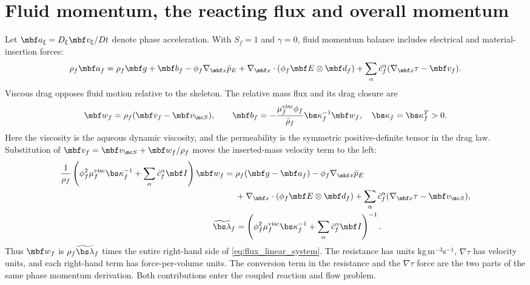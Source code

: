 \documentclass[11pt]{article}
\begin{document}
\section{Fluid momentum, the reacting flux and overall momentum}
Let \(\mbf a_\xi=D_\xi\mbf v_\xi/Dt\) denote phase acceleration. With \(S_f=1\) and \(\gamma=0\), fluid momentum balance includes electrical and material-insertion forces:
\begin{equation}
 \rho_f\mbf a_f=\rho_f\mbf g+\mbf b_f
 -\phi_f\nabla_{\mbf x}\bar p_E
 +\nabla_{\mbf x}\cdot(\phi_f\mbf E\otimes\mbf d_f)
 +\sum_\alpha\dot c_f^\alpha(\nabla_{\mbf x}\tau-\mbf v_f).
 \label{eq:fluid_momentum}
\end{equation}
Viscous drag opposes fluid motion relative to the skeleton. The relative mass flux and its drag closure are
\begin{equation}
 \mbf w_f=\rho_f(\mbf v_f-\mbf v_{\mc S}),
 \qquad \mbf b_f=-\frac{\mu_f^{\rm visc}\phi_f}{\bar\rho_f}\bs\kappa_f^{-1}\mbf w_f,
 \quad \bs\kappa_f=\bs\kappa_f^T>0.
 \label{eq:drag}
\end{equation}
Here the viscosity is the aqueous dynamic viscosity, and the permeability is the symmetric positive-definite tensor in the drag law. Substitution of \(\mbf v_f=\mbf v_{\mc S}+\mbf w_f/\rho_f\) moves the inserted-mass velocity term to the left:
\begin{align}
 \frac1{\rho_f}\left(\phi_f^2\mu_f^{\rm visc}\bs\kappa_f^{-1}
 +\sum_\alpha\dot c_f^\alpha\mbf I\right)\mbf w_f
 ={}&\rho_f(\mbf g-\mbf a_f)-\phi_f\nabla_{\mbf x}\bar p_E\notag\\
 &+\nabla_{\mbf x}\cdot(\phi_f\mbf E\otimes\mbf d_f)
 +\sum_\alpha\dot c_f^\alpha(\nabla_{\mbf x}\tau-\mbf v_{\mc S}),\label{eq:flux_linear_system}\\
 \widetilde{\bs\lambda}_f&=
 \left(\phi_f^2\mu_f^{\rm visc}\bs\kappa_f^{-1}
 +\sum_\alpha\dot c_f^\alpha\mbf I\right)^{-1}.\label{eq:corrected_mobility}
\end{align}
Thus \(\mbf w_f\) is \(\rho_f\widetilde{\bs\lambda}_f\) times the entire right-hand side of \eqref{eq:flux_linear_system}. The resistance has units kg\,m\(^{-3}\)s\(^{-1}\), \(\nabla\tau\) has velocity units, and each right-hand term has force-per-volume units. The conversion term in the resistance and the \(\nabla\tau\) force are the two parts of the same phase momentum derivation. Both contributions enter the coupled reaction and flow problem.
\end{document}
